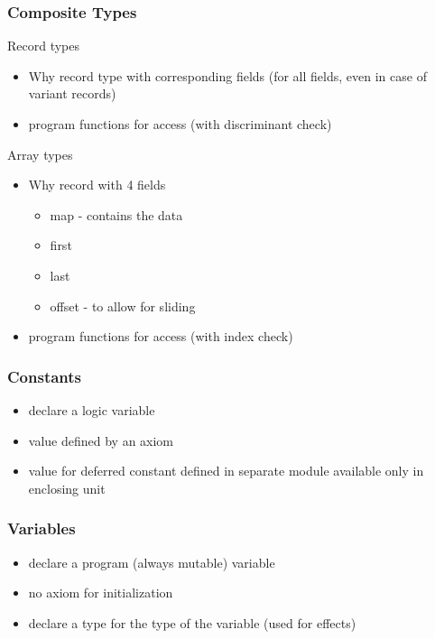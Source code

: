 \documentclass{beamer}
\newenvironment{specialframe}{%
  \begin{frame}[fragile,environment=specialframe]}{\end{frame}}
\begin{document}
\begin{specialframe}\frametitle{Composite Types}
   \begin{block}{Record types}
      \begin{itemize}
         \item Why record type with corresponding fields
               (for all fields, even in case of variant records)
         \item program functions for access (with discriminant check)
      \end{itemize}
   \end{block}

   \begin{block}{Array types}
      \begin{itemize}
      \item Why record with 4 fields
        \begin{itemize}
        \item map - contains the data
        \item first
        \item last
        \item offset - to allow for sliding
        \end{itemize}
      \item program functions for access (with index check)
      \end{itemize}
   \end{block}
\end{specialframe}

\begin{specialframe}\frametitle{Constants}
   \begin{itemize}
      \item declare a logic variable
      \item value defined by an axiom
      \item value for deferred constant defined in separate module available
        only in enclosing unit
   \end{itemize}
\end{specialframe}

\begin{specialframe}\frametitle{Variables}
   \begin{itemize}
      \item declare a program (always mutable) variable
      \item no axiom for initialization
      \item declare a type for the type of the variable (used for effects)
   \end{itemize}
\end{specialframe}
\end{document}
